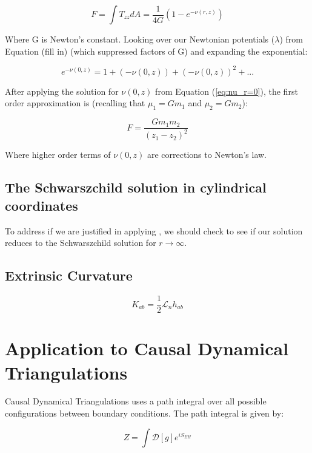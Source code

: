 \documentclass{article}
\begin{document}
\begin{equation}
F=\int T_{zz}dA=\frac{1}{4G}\left(1-e^{-\nu (r,z)}\right)
\end{equation}

Where G is Newton's constant. Looking over our Newtonian potentials ($\lambda$) from Equation (fill in) (which suppressed factors of G) and expanding the exponential:

\begin{equation}
e^{-\nu\left(0,z\right)}=1+\left(-\nu\left(0,z\right)\right)+\left(-\nu\left(0,z\right)\right)^{2}+...
\end{equation}

After applying the solution for $\nu(0,z)$ from Equation (\ref{eq:nu_r=0}), the first order approximation is (recalling that $\mu_{1}=Gm_{1}$ and $\mu_{2}=Gm_{2}$):

\begin{equation}
F=\frac{Gm_{1}m_{2}}{\left(z_{1}-z_{2}\right)^{2}}
\end{equation}

Where higher order terms of $\nu\left(0,z\right)$ are corrections to
Newton's law.

\subsection{The Schwarszchild solution in cylindrical coordinates}

To address if we are justified in applying , we should check to see if our solution reduces to the Schwarszchild solution for $r\rightarrow\infty$.

\subsection{Extrinsic Curvature}

\begin{equation}
K_{ab}=\frac{1}{2}\mathcal{L}_{n}h_{ab}
\end{equation}

\section{Application to Causal Dynamical Triangulations}

Causal Dynamical Triangulations uses a path integral over all possible
configurations between boundary conditions. The path integral is given
by:

\begin{equation}
  \label{eq:path-integral}
Z=\int \mathcal{D}[g]e^{iS_ {EH}}
\end{equation}
\end{document}
